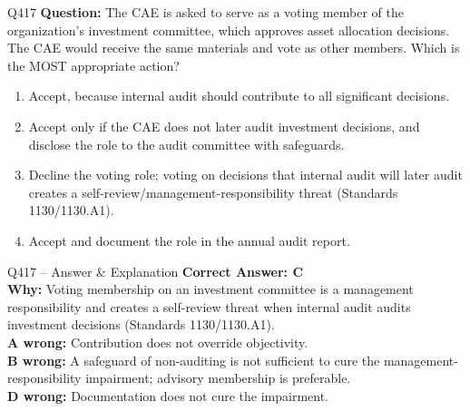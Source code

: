 \documentclass[aspectratio=169,10pt]{beamer}
\begin{document}
	\begin{frame}[t]{Q417}
		\small
		\textbf{Question:} The CAE is asked to serve as a voting member of the organization's investment committee, which approves asset allocation decisions. The CAE would receive the same materials and vote as other members. Which is the MOST appropriate action?
		\begin{enumerate}[label=\Alph*.,itemsep=1pt,topsep=2pt]
			\item Accept, because internal audit should contribute to all significant decisions.
			\item Accept only if the CAE does not later audit investment decisions, and disclose the role to the audit committee with safeguards.
			\item Decline the voting role; voting on decisions that internal audit will later audit creates a self-review/management-responsibility threat (Standards 1130/1130.A1).
			\item Accept and document the role in the annual audit report.
		\end{enumerate}
	\end{frame}
	
	\begin{frame}[t]{Q417 -- Answer \& Explanation}
		\small
		\textbf{Correct Answer: C} \\[4pt]
		\textbf{Why:} Voting membership on an investment committee is a management responsibility and creates a self-review threat when internal audit audits investment decisions (Standards 1130/1130.A1). \\[4pt]
		\textbf{A wrong:} Contribution does not override objectivity. \\[2pt]
		\textbf{B wrong:} A safeguard of non-auditing is not sufficient to cure the management-responsibility impairment; advisory membership is preferable. \\[2pt]
		\textbf{D wrong:} Documentation does not cure the impairment.
	\end{frame}
	
\end{document}
